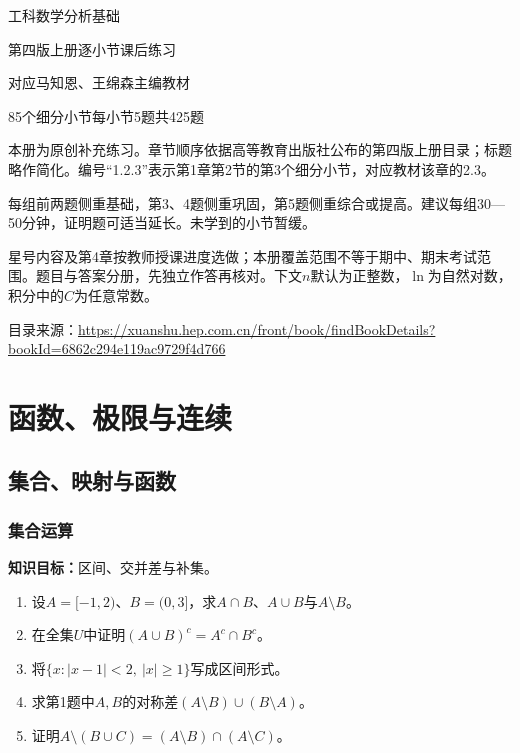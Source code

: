 \documentclass[11pt,a4paper,fontset=fandol]{ctexrep}
\newcommand{\goal}[1]{\textbf{知识目标：}#1\par}
\begin{document}
\begin{titlepage}\centering
{\Huge 工科数学分析基础\par}\vspace{8mm}
{\LARGE 第四版上册\quad 逐小节课后练习\par}\vspace{10mm}
{\Large 对应马知恩、王绵森主编教材\par}\vspace{8mm}
85个细分小节\quad 每小节5题\quad 共425题\par
\vfill\raggedright
本册为原创补充练习。章节顺序依据高等教育出版社公布的第四版上册目录；标题略作简化。编号“1.2.3”表示第1章第2节的第3个细分小节，对应教材该章的2.3。

每组前两题侧重基础，第3、4题侧重巩固，第5题侧重综合或提高。建议每组30—50分钟，证明题可适当延长。未学到的小节暂缓。

星号内容及第4章按教师授课进度选做；本册覆盖范围不等于期中、期末考试范围。题目与答案分册，先独立作答再核对。下文$n$默认为正整数，$\ln$为自然对数，积分中的$C$为任意常数。\par
\vspace{6mm}
目录来源：\url{https://xuanshu.hep.com.cn/front/book/findBookDetails?bookId=6862c294e119ac9729f4d766}
\end{titlepage}
\tableofcontents
\chapter{函数、极限与连续}
\section{集合、映射与函数}
\subsection{集合运算}
\goal{区间、交并差与补集。}
\begin{enumerate}
\item 设$A=[-1,2)$、$B=(0,3]$，求$A\cap B$、$A\cup B$与$A\setminus B$。
\item 在全集$U$中证明$(A\cup B)^c=A^c\cap B^c$。
\item 将$\{x:|x-1|<2,\ |x|\ge1\}$写成区间形式。
\item 求第1题中$A,B$的对称差$(A\setminus B)\cup(B\setminus A)$。
\item 证明$A\setminus(B\cup C)=(A\setminus B)\cap(A\setminus C)$。
\end{enumerate}
\end{document}
